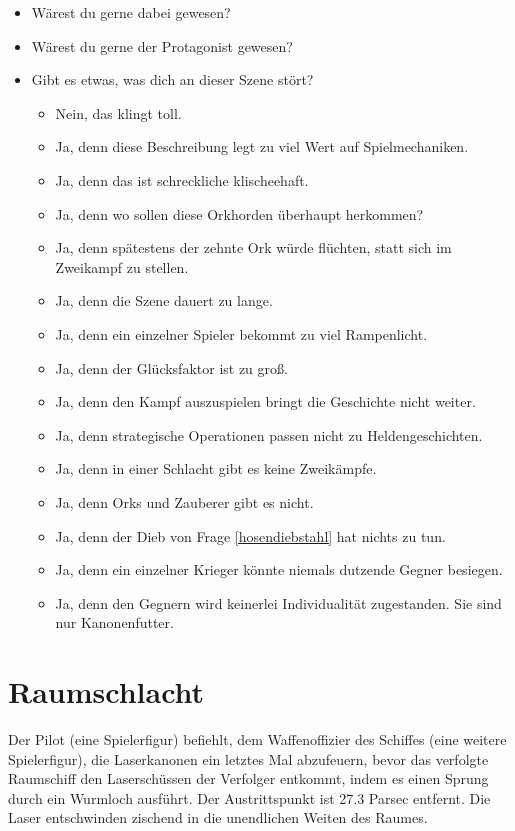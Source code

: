 \documentclass{article}
\begin{document}
\begin{itemize}
\item  Wärest du gerne dabei gewesen?
\item  Wärest du gerne der Protagonist gewesen?
\item  Gibt es etwas, was dich an dieser Szene stört?
  \begin{itemize}
  \item Nein, das klingt toll.
  \item Ja, denn diese Beschreibung legt zu viel Wert auf Spielmechaniken.
  \item Ja, denn das ist schreckliche klischeehaft.
  \item Ja, denn wo sollen diese Orkhorden überhaupt herkommen?
  \item Ja, denn spätestens der zehnte Ork würde flüchten, statt sich im Zweikampf zu stellen.
  \item Ja, denn die Szene dauert zu lange.
  \item Ja, denn ein einzelner Spieler bekommt zu viel Rampenlicht.
  \item Ja, denn der Glücksfaktor ist zu groß.
  \item Ja, denn den Kampf auszuspielen bringt die Geschichte nicht weiter.
  \item Ja, denn strategische Operationen passen nicht zu Heldengeschichten.
  \item Ja, denn in einer Schlacht gibt es keine Zweikämpfe.
  \item Ja, denn Orks und Zauberer gibt es nicht.
  \item Ja, denn der Dieb von Frage \ref{hosendiebstahl} hat nichts zu tun.
  \item Ja, denn ein einzelner Krieger könnte niemals dutzende Gegner besiegen.
  \item Ja, denn den Gegnern wird keinerlei Individualität zugestanden. Sie sind nur Kanonenfutter.
  \end{itemize}
\end{itemize}

\section{Raumschlacht}
\label{raumschlacht}

Der Pilot (eine Spielerfigur) befiehlt, dem Waffenoffizier des
Schiffes (eine weitere Spielerfigur), die Laserkanonen ein letztes Mal
abzufeuern, bevor das verfolgte Raumschiff den Laserschüssen der
Verfolger entkommt, indem es einen Sprung durch ein Wurmloch
ausführt. Der Austrittspunkt ist 27.3 Parsec entfernt. Die Laser
entschwinden zischend in die unendlichen Weiten des Raumes.
\end{document}
